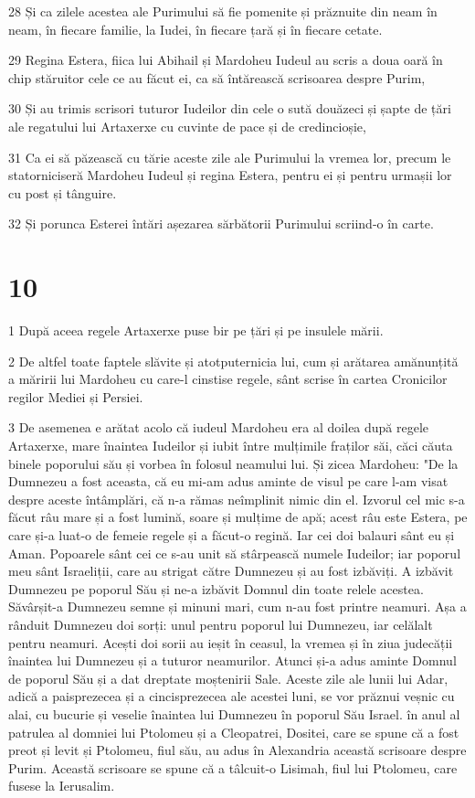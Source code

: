 \par 28 Și ca zilele acestea ale Purimului să fie pomenite și prăznuite din neam în neam, în fiecare familie, la Iudei, în fiecare țară și în fiecare cetate.
\par 29 Regina Estera, fiica lui Abihail și Mardoheu Iudeul au scris a doua oară în chip stăruitor cele ce au făcut ei, ca să întărească scrisoarea despre Purim,
\par 30 Și au trimis scrisori tuturor Iudeilor din cele o sută douăzeci și șapte de țări ale regatului lui Artaxerxe cu cuvinte de pace și de credincioșie,
\par 31 Ca ei să păzească cu tărie aceste zile ale Purimului la vremea lor, precum le statorniciseră Mardoheu Iudeul și regina Estera, pentru ei și pentru urmașii lor cu post și tânguire.
\par 32 Și porunca Esterei întări așezarea sărbătorii Purimului scriind-o în carte.

\chapter{10}

\par 1 După aceea regele Artaxerxe puse bir pe țări și pe insulele mării.
\par 2 De altfel toate faptele slăvite și atotputernicia lui, cum și arătarea amănunțită a măririi lui Mardoheu cu care-l cinstise regele, sânt scrise în cartea Cronicilor regilor Mediei și Persiei.
\par 3 De asemenea e arătat acolo că iudeul Mardoheu era al doilea după regele Artaxerxe, mare înaintea Iudeilor și iubit între mulțimile fraților săi, căci căuta binele poporului său și vorbea în folosul neamului lui. Și zicea Mardoheu: "De la Dumnezeu a fost aceasta, că eu mi-am adus aminte de visul pe care l-am visat despre aceste întâmplări, că n-a rămas neîmplinit nimic din el. Izvorul cel mic s-a făcut râu mare și a fost lumină, soare și mulțime de apă; acest râu este Estera, pe care și-a luat-o de femeie regele și a făcut-o regină. Iar cei doi balauri sânt eu și Aman. Popoarele sânt cei ce s-au unit să stârpească numele Iudeilor; iar poporul meu sânt Israeliții, care au strigat către Dumnezeu și au fost izbăviți. A izbăvit Dumnezeu pe poporul Său și ne-a izbăvit Domnul din toate relele acestea. Săvârșit-a Dumnezeu semne și minuni mari, cum n-au fost printre neamuri. Așa a rânduit Dumnezeu doi sorți: unul pentru poporul lui Dumnezeu, iar celălalt pentru neamuri. Acești doi sorii au ieșit în ceasul, la vremea și în ziua judecății înaintea lui Dumnezeu și a tuturor neamurilor. Atunci și-a adus aminte Domnul de poporul Său și a dat dreptate moștenirii Sale. Aceste zile ale lunii lui Adar, adică a paisprezecea și a cincisprezecea ale acestei luni, se vor prăznui veșnic cu alai, cu bucurie și veselie înaintea lui Dumnezeu în poporul Său Israel. în anul al patrulea al domniei lui Ptolomeu și a Cleopatrei, Dositei, care se spune că a fost preot și levit și Ptolomeu, fiul său, au adus în Alexandria această scrisoare despre Purim. Această scrisoare se spune că a tâlcuit-o Lisimah, fiul lui Ptolomeu, care fusese la Ierusalim.


